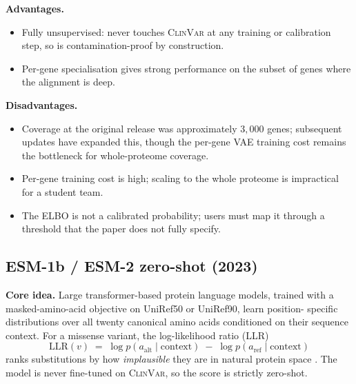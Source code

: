 \documentclass[11pt,a4paper,oneside]{report}
\begin{document}
\textbf{Advantages.}
\begin{itemize}[leftmargin=2em, itemsep=0.15em]
  \item Fully unsupervised: never touches \textsc{ClinVar}
    at any training or calibration step, so is
    contamination-proof by construction.
  \item Per-gene specialisation gives strong performance
    on the subset of genes where the alignment is deep.
\end{itemize}

\textbf{Disadvantages.}
\begin{itemize}[leftmargin=2em, itemsep=0.15em]
  \item Coverage at the original release was approximately
    $3{,}000$ genes; subsequent updates have expanded this,
    though the per-gene VAE training cost remains the
    bottleneck for whole-proteome coverage.
  \item Per-gene training cost is high; scaling to the
    whole proteome is impractical for a student team.
  \item The ELBO is not a calibrated probability; users
    must map it through a threshold that the paper does
    not fully specify.
\end{itemize}

\subsection{ESM-1b / ESM-2 zero-shot (2023)
  \texorpdfstring{\citep{brandes2023esm1b, lin2023esm2}}{(Brandes et al., 2023; Lin et al., 2023)}}
\label{sec:rw-esm}

\textbf{Core idea.} Large transformer-based protein
language models, trained with a masked-amino-acid
objective on UniRef50 or UniRef90, learn position-
specific distributions over all twenty canonical amino
acids conditioned on their sequence context. For a
missense variant, the log-likelihood ratio (LLR)
\[
\mathrm{LLR}(v) \;=\;
\log p(a_{\text{alt}} \mid \text{context}) \;-\;
\log p(a_{\text{ref}} \mid \text{context})
\]
ranks substitutions by how \emph{implausible} they are
in natural protein space
\citep{brandes2023esm1b, meier2021language}. The model
is never fine-tuned on \textsc{ClinVar}, so the score
is strictly zero-shot.
\end{document}
